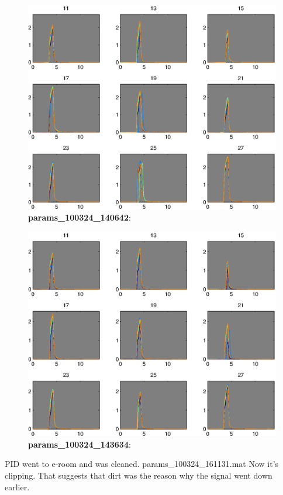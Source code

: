 \documentclass[a4paper]{report}
\begin{document}
\begin{figure}
\centering
\includegraphics[width=5in]{params_100324_140642.eps}
\caption{\textbf{params\_100324\_140642}:}
\end{figure}


\begin{figure}
\centering
\includegraphics[width=5in]{params_100324_143634.eps}
\caption{\textbf{params\_100324\_143634}:}
\end{figure}
\clearpage
PID went to e-room and was cleaned. params\_100324\_161131.mat Now
it's clipping. That suggests that dirt was the reason why the signal
went down earlier. 
\end{document}
